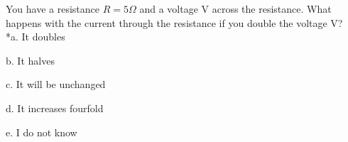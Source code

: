 
You have a resistance \( R = 5 \Omega \) and a voltage V across the resistance. What happens with the current through the resistance if you double the voltage V? \\

*a. It doubles

b. It halves

c. It will be unchanged

d. It increases fourfold

e. I do not know \\
